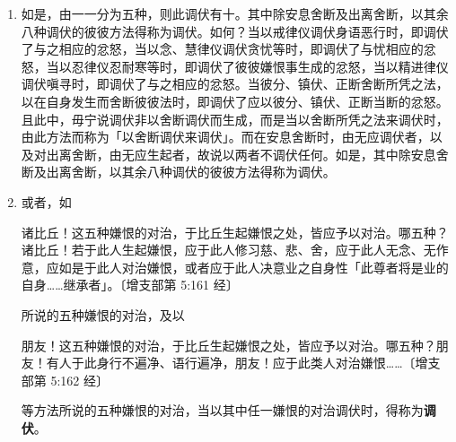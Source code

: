 \begin{enumerate}
\item 如是，由一一分为五种，则此调伏有十。其中除安息舍断及出离舍断，以其余八种调伏的彼彼方法得称为调伏。如何？当以戒律仪调伏身语恶行时，即调伏了与之相应的忿怒，当以念、慧律仪调伏贪忧等时，即调伏了与忧相应的忿怒，当以忍律仪忍耐寒等时，即调伏了彼彼嫌恨事生成的忿怒，当以精进律仪调伏嗔寻时，即调伏了与之相应的忿怒。当彼分、镇伏、正断舍断所凭之法，以在自身发生而舍断彼彼法时，即调伏了应以彼分、镇伏、正断当断的忿怒。且此中，毋宁说调伏非以舍断调伏而生成，而是当以舍断所凭之法来调伏时，由此方法而称为「以舍断调伏来调伏」。而在安息舍断时，由无应调伏者，以及对出离舍断，由无应生起者，故说以两者不调伏任何。如是，其中除安息舍断及出离舍断，以其余八种调伏的彼彼方法得称为调伏。
\item 或者，如\begin{quoting}诸比丘！这五种嫌恨的对治，于比丘生起嫌恨之处，皆应予以对治。哪五种？诸比丘！若于此人生起嫌恨，应于此人修习慈、悲、舍，应于此人无念、无作意，应如是于此人对治嫌恨，或者应于此人决意业之自身性「此尊者将是业的自身……继承者」。{\bluefootnotesize 〔增支部第 5:161 经〕}\end{quoting}所说的五种嫌恨的对治，及以\begin{quoting}朋友！这五种嫌恨的对治，于比丘生起嫌恨之处，皆应予以对治。哪五种？朋友！有人于此身行不遍净、语行遍净，朋友！应于此类人对治嫌恨……{\bluefootnotesize 〔增支部第 5:162 经〕}\end{quoting}等方法所说的五种嫌恨的对治，当以其中任一嫌恨的对治调伏时，得称为\textbf{调伏}。

\end{enumerate}
